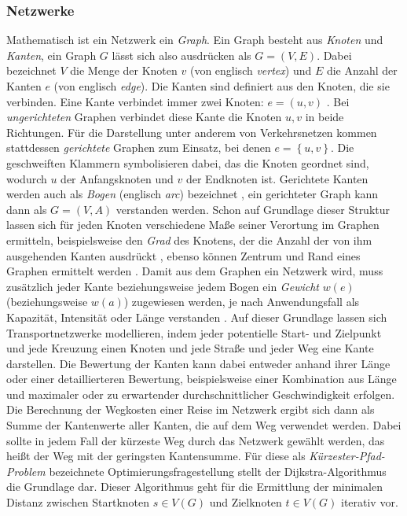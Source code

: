 \documentclass[11pt,pdftex,a4paper]{scrartcl}
\begin{document}
	\subsubsection{Netzwerke}
	Mathematisch ist ein Netzwerk ein \textit{Graph}. Ein Graph besteht aus \textit{Knoten} und \textit{Kanten}, ein Graph $G$ lässt sich also ausdrücken als $G=\left(V,E\right)$. Dabei bezeichnet $V$ die Menge der Knoten $v$ (von englisch \textit{vertex}) und $E$ die Anzahl der Kanten $e$ (von englisch \textit{edge}). Die Kanten sind definiert aus den Knoten, die sie verbinden. Eine Kante verbindet immer zwei Knoten: $e=\left(u,v\right)$ \parencite[12f]{tittmannGraphentheorie2022}. Bei \textit{ungerichteten} Graphen verbindet diese Kante die Knoten $u,v$ in beide Richtungen. Für die Darstellung unter anderem von Verkehrsnetzen kommen stattdessen \textit{gerichtete} Graphen zum Einsatz, bei denen $e=\left\{u,v\right\}$. Die geschweiften Klammern symbolisieren dabei, das die Knoten geordnet sind, wodurch $u$ der Anfangsknoten und $v$ der Endknoten ist. Gerichtete Kanten werden auch als \textit{Bogen} (englisch \textit{arc}) bezeichnet \parencite[127]{tittmannGraphentheorie2022}, ein gerichteter Graph kann dann als $G=\left(V,A\right)$ verstanden werden.
	Schon auf Grundlage dieser Struktur lassen sich für jeden Knoten verschiedene Maße seiner Verortung im Graphen ermitteln, beispielsweise den \textit{Grad} des Knotens, der die Anzahl der von ihm ausgehenden Kanten ausdrückt \parencite[14f]{tittmannGraphentheorie2022}, ebenso können Zentrum und Rand eines Graphen ermittelt werden \parencite[35f]{tittmannGraphentheorie2022}. Damit aus dem Graphen ein Netzwerk wird, muss zusätzlich jeder Kante beziehungsweise jedem Bogen ein \textit{Gewicht} $w(e)$ (beziehungsweise $w(a)$) zugewiesen werden, je nach Anwendungsfall als Kapazität, Intensität oder Länge verstanden \parencites[142]{tittmannGraphentheorie2022}[16]{bondyGraphTheory1982}[3]{bastRoutePlanningTransportation2015}. Auf dieser Grundlage lassen sich Transportnetzwerke modellieren, indem jeder potentielle Start- und Zielpunkt und jede Kreuzung einen Knoten und jede Straße und jeder Weg eine Kante darstellen. Die Bewertung der Kanten kann dabei entweder anhand ihrer Länge oder einer detaillierteren Bewertung, beispielsweise einer Kombination aus Länge und maximaler oder zu erwartender durchschnittlicher Geschwindigkeit erfolgen. Die Berechnung der Wegkosten einer Reise im Netzwerk ergibt sich dann als Summe der Kantenwerte aller Kanten, die auf dem Weg verwendet werden. Dabei sollte in jedem Fall der kürzeste Weg durch das Netzwerk gewählt werden, das heißt der Weg mit der geringsten Kantensumme. Für diese als \textit{Kürzester-Pfad-Problem} bezeichnete Optimierungsfragestellung \parencite[3]{bastRoutePlanningTransportation2015} stellt der Dijkstra-Algorithmus \parencite{dijkstraNoteTwoProblems1959} die Grundlage dar. Dieser Algorithmus geht für die Ermittlung der minimalen Distanz zwischen Startknoten $s\in V(G)$ und Zielknoten $ t\in V(G)$ iterativ vor.
	
\end{document}
